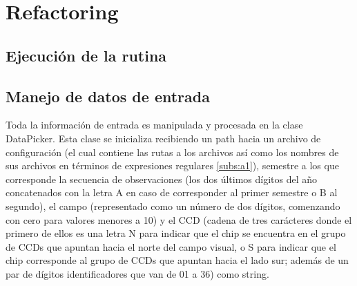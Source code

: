 \chapter{Refactoring}
\label{ch:refactoring}
\section{Ejecuci\'on de la rutina}
\section{Manejo de datos de entrada}
Toda la informaci\'on de entrada es manipulada y procesada en la clase DataPicker. Esta clase se inicializa recibiendo un path hacia un archivo de configuraci\'on (el cual contiene las rutas a los archivos as\'i como los nombres de sus archivos en t\'erminos de expresiones regulares \ref{subs:a1}), semestre a los que corresponde la secuencia de observaciones (los dos \'ultimos d\'igitos del a\~no concatenados con la letra A en caso de corresponder al primer semestre o B al segundo), el campo (representado como un n\'umero de dos d\'igitos, comenzando con cero para valores menores a 10) y el CCD (cadena de tres car\'acteres donde el primero de ellos es una letra N para indicar que el chip se encuentra en el grupo de CCDs que apuntan hacia el norte del campo visual, o S para indicar que el chip corresponde al grupo de CCDs que apuntan hacia el lado sur; adem\'as de un par de d\'igitos identificadores que van de 01 a 36) como string.
\bigskip


